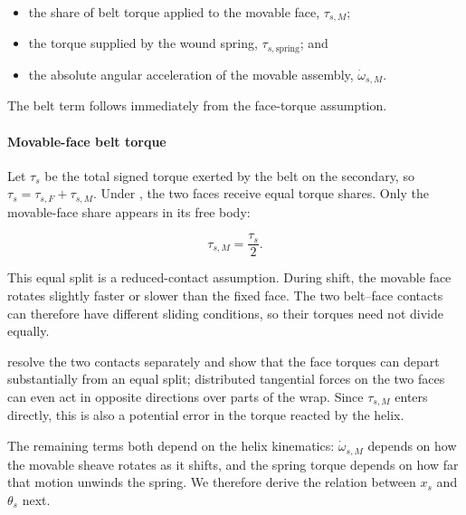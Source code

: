 \documentclass[11pt]{report}
\numberwithin{equation}{section}
\newcounter{assump}
\begin{document}
\begin{itemize}
    \item the share of belt torque applied to the movable face,
    \(\tau_{s,M}\);
    \item the torque supplied by the wound spring,
    \(\tau_{s,\mathrm{spring}}\); and
    \item the absolute angular acceleration of the movable assembly,
    \(\dot\omega_{s,M}\).
\end{itemize}

The belt term follows immediately from the face-torque assumption.

\paragraph{Movable-face belt torque}

Let \(\tau_s\) be the total signed torque exerted by the belt on the secondary,
so
\(\tau_s=\tau_{s,F}+\tau_{s,M}\). Under
, the two faces receive equal torque
shares. Only the movable-face share appears in its free body:

\begin{equation}
    \tau_{s,M}
    =
    \frac{\tau_s}{2}.
    \label{eq:secondary_movable_face_belt_torque}
\end{equation}

This equal split is a reduced-contact assumption. During shift, the movable
face rotates slightly faster or slower than the fixed face. The two
belt--face contacts can therefore have different sliding conditions, so their
torques need not divide equally.

\begin{remarkbox}
\citet{SorgeCammalleri2011} resolve the two contacts separately and show that
the face torques can depart substantially from an equal split; distributed
tangential forces on the two faces can even act in opposite directions over
parts of the wrap. Since \(\tau_{s,M}\) enters
 directly, this is also a
potential error in the torque reacted by the helix.
\end{remarkbox}

The remaining terms both depend on the helix kinematics:
\(\dot\omega_{s,M}\) depends on how the movable sheave rotates as it shifts,
and the spring torque depends on how far that motion unwinds the spring. We
therefore derive the relation between \(x_s\) and \(\theta_s\) next.
\end{document}
